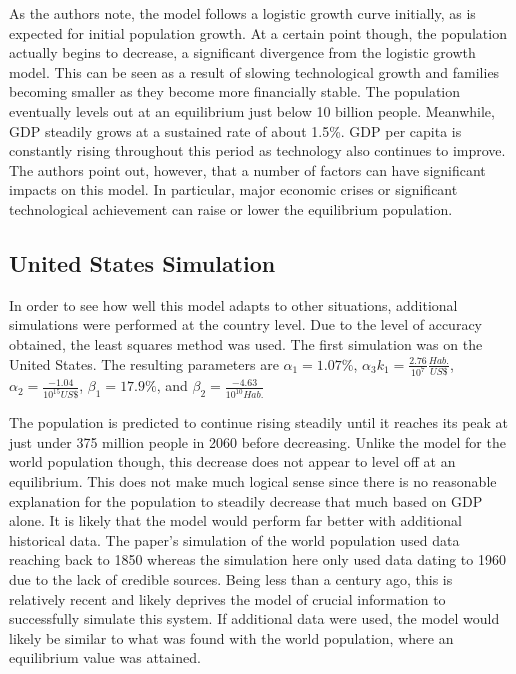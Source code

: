 \documentclass[a4paper]{article}
\begin{document}
As the authors note, the model follows a logistic growth curve initially, as is expected for initial population growth. At a certain point though, the population actually begins to decrease, a significant divergence from the logistic growth model. This can be seen as a result of slowing technological growth and families becoming smaller as they become more financially stable. The population eventually levels out at an equilibrium just below 10 billion people. Meanwhile, GDP steadily grows at a sustained rate of about 1.5\%. GDP per capita is constantly rising throughout this period as technology also continues to improve. The authors point out, however, that a number of factors can have significant impacts on this model. In particular, major economic crises or significant technological achievement can raise or lower the equilibrium population. 

\subsection{United States Simulation}

In order to see how well this model adapts to other situations, additional simulations were performed at the country level. Due to the level of accuracy obtained, the least squares method was used. The first simulation was on the United States. The resulting parameters are $\alpha_1 = 1.07\%$, $\alpha_3 k_1 = \frac{2.76}{10^{7}}\frac{Hab.}{US \$}$, $\alpha_2 = \frac{-1.04}{10^{15} US\$}$, $\beta_1 = 17.9\%$, and $\beta_2 = \frac{-4.63}{10^{10} Hab.}$ 

The population is predicted to continue rising steadily until it reaches its peak at just under 375 million people in 2060 before decreasing. Unlike the model for the world population though, this decrease does not appear to level off at an equilibrium. This does not make much logical sense since there is no reasonable explanation for the population to steadily decrease that much based on GDP alone. It is likely that the model would perform far better with additional historical data. The paper's simulation of the world population used data reaching back to 1850 whereas the simulation here only used data dating to 1960 due to the lack of credible sources. Being less than a century ago, this is relatively recent and likely deprives the model of crucial information to successfully simulate this system. If additional data were used, the model would likely be similar to what was found with the world population, where an equilibrium value was attained.
\end{document}
